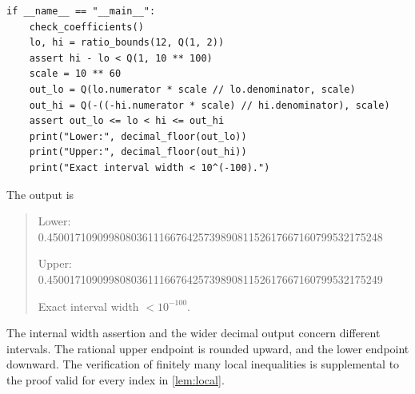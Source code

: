 \documentclass[11pt,a4paper]{article}
\numberwithin{equation}{section}
\theoremstyle{definition}
\theoremstyle{remark}
\begin{document}
\begin{lstlisting}
if __name__ == "__main__":
    check_coefficients()
    lo, hi = ratio_bounds(12, Q(1, 2))
    assert hi - lo < Q(1, 10 ** 100)
    scale = 10 ** 60
    out_lo = Q(lo.numerator * scale // lo.denominator, scale)
    out_hi = Q(-((-hi.numerator * scale) // hi.denominator), scale)
    assert out_lo <= lo < hi <= out_hi
    print("Lower:", decimal_floor(out_lo))
    print("Upper:", decimal_floor(out_hi))
    print("Exact interval width < 10^(-100).")
\end{lstlisting}
The output is
\begin{quote}\ttfamily\small
Lower: 0.450017109099808036111667642573989081152617667160799532175248\par
Upper: 0.450017109099808036111667642573989081152617667160799532175249\par
Exact interval width $<10^{-100}$.
\end{quote}
The internal width assertion and the wider decimal output concern different
intervals. The rational upper endpoint is rounded upward, and the lower
endpoint downward. The verification of finitely many local inequalities
is supplemental to the proof valid for every index in \cref{lem:local}.
\end{document}
